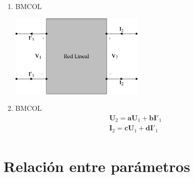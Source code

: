 \begin{enumerate}
\item \hfill{}\textsc{BMCOL}
\label{sec:org770263e}

\includegraphics[height=4cm]{../figs/cuadripolo_transmision_inversa.pdf}


\item \hfill{}\textsc{BMCOL}
\label{sec:orgc57f0bc}
\renewcommand{\arraystretch}{1}
\[
\begin{array}{l}
  \mathbf{U}_2 = \mathbf{a} \mathbf{U}_1 + \mathbf{b}\mathbf{I'}_1\\
  \mathbf{I}_2 = \mathbf{c} \mathbf{U}_1 + \mathbf{d} \mathbf{I'}_1\\
\end{array}
\]
\end{enumerate}


\section{Relación entre parámetros}
\label{sec:org2eae33c}

